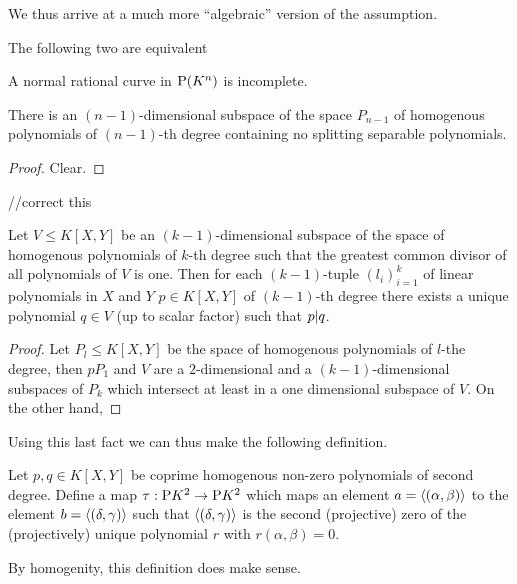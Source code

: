 We thus arrive at a much more ``algebraic'' version of the assumption. 

\begin{lemma}
    The following two are equivalent
    \begin{statements}
            \item A normal rational curve in $\mathrm{P} (K^n)$ is incomplete.
            \item There is an $(n-1)$-dimensional subspace of the space $P_{n-1}$ of homogenous polynomials of $(n-1)$-th degree containing no splitting separable polynomials.
    \end{statements}
\end{lemma}

\begin{proof}
    Clear.
\end{proof}

//correct this

\begin{lemma}
    Let $V\leq K[X,Y]$ be an $(k-1)$-dimensional subspace of the space of homogenous polynomials of $k$-th degree such that the greatest common divisor of all polynomials of $V$ is one.
    Then for each $(k-1)$-tuple $(l_i)_{i=1}^k$ of linear polynomials in $X$ and $Y$ $p\in K[X,Y]$ of $(k-1)$-th degree there exists a unique polynomial $q\in V$ (up to scalar factor) such that $p| q$.
\end{lemma}

\begin{proof}
    Let $P_l\leq K[X,Y]$ be the space of homogenous polynomials of $l$-the degree, then $pP_1$ and $V$ are a $2$-dimensional and a $(k-1)$-dimensional subspaces of $P_k$ which intersect at least in a one dimensional subspace of $V$. On the other hand, 
\end{proof}

Using this last fact we can thus make the following definition.

\begin{definition}
    Let $p,q\in K[X,Y]$ be coprime homogenous non-zero polynomials of second degree. Define a map
    $\tau:\mathrm{P}{K^2}\rightarrow\mathrm{P}{K^2}$ which maps an element $a=\gen{(\alpha,\beta)}$ to the element $b=\gen{(\delta,\gamma)}$ such that $\gen{(\delta,\gamma)}$ is the second (projective) zero of the (projectively) unique polynomial $r$ with $r(\alpha,\beta)=0$.
\end{definition}

\begin{remark}
    By homogenity, this definition does make sense.
\end{remark}

